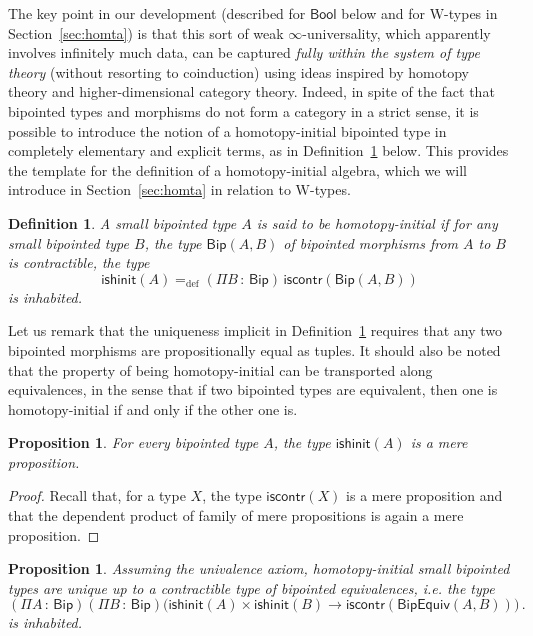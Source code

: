 \documentclass[10pt,a4paper,oneside,reqno]{amsart}
\numberwithin{equation}{section}
\theoremstyle{mythm}
\newtheorem{proposition}[theorem]{Proposition}
\theoremstyle{mydef}
\newtheorem{definition}[theorem]{Definition}
\theoremstyle{myrmk}
\newcommand{\ie}{\text{i.e.\ }}
\newcommand{\defeq}{=_{\mathrm{def}}}
\newcommand{\co}{\,{:}\,}
\newcommand{\iscontr}{\mathsf{iscontr}}
\newcommand{\ishinit}{\mathsf{ishinit}}
\newcommand{\isbiphinit}{\mathsf{ishinit}}
\newcommand{\Bool}{\mathsf{Bool}}
\newcommand{\W}{\mathrm{W}}
\newcommand{\Bip}{\mathsf{Bip}}
\newcommand{\BipHom}{\mathsf{Bip}}
\newcommand{\BipEquiv}{\mathsf{BipEquiv}}
\begin{document}
The key point in our development (described for $\Bool$ below and for $\W$-types in Section~\ref{sec:homta}) is that this sort of weak $\infty$-universality, which apparently involves infinitely much data, can be captured \emph{fully within the system of type theory} (without resorting to coinduction) using ideas inspired by homotopy theory and higher-dimensional category theory. Indeed, in spite of the fact that bipointed types and morphisms do not form a category in a strict sense, it is possible to introduce the  notion of a homotopy-initial bipointed type in completely elementary and explicit terms, as in Definition~\ref{def:BoolInit} below. This provides the template for the definition of a homotopy-initial algebra, which we will introduce in Section~\ref{sec:homta} in relation to $\W$-types.



\begin{definition}\label{def:BoolInit}
A small bipointed type $A$ is said to be \emph{homotopy-initial}  if for any small bipointed type $B$, the type $\BipHom(A,B)$ of bipointed morphisms from $A$ to $B$
is contractible, \ie the type
\[
\ishinit(A) \defeq (\Pi B \co \Bip) \, \iscontr(\BipHom(A, B) )
\] 
is inhabited.
\end{definition}

Let us remark that the uniqueness implicit in Definition~\ref{def:BoolInit} requires that any two bipointed morphisms are propositionally equal as tuples. It should also be noted that the property of being  homotopy-initial  can be transported along equivalences, in the sense that if two bipointed types are equivalent, then one is homotopy-initial if and only if the other one is.  

\begin{proposition} \label{thm:isbiphinitishprop} For every bipointed type $A$, the type $\ishinit(A)$ is a mere proposition.
\end{proposition}

\begin{proof} Recall that, for a type $X$, the type $\iscontr(X)$ is a mere proposition and that the dependent product of family of mere propositions is again a mere proposition. 
\end{proof} 


\begin{proposition} \label{BoolHInitIso} 
Assuming the univalence axiom, 
homotopy-initial small bipointed types are unique up to a contractible type of bipointed equivalences, i.e. the type
\[ 
(\Pi A \co \Bip) (\Pi B \co \Bip)
\big( \isbiphinit(A) \times \isbiphinit(B) \to \iscontr(\BipEquiv(A,B)) \big) \, .
\] 
is inhabited.
\end{proposition}
\end{document}
